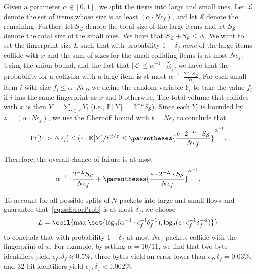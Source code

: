 Given a parameter $\alpha\in [0,1]$, we split the items into large and small ones. Let $\mathcal L$  denote the set of items whose size is at least $(\alpha\cdot N\epsilon_f)$, and let $\mathcal S$ denote the remaining. 
Further, let $S_{\mathcal L}$ denote the total size of the large items and let $S_{\mathcal S}$ denote the total size of the small ones. We have that $S_{\mathcal L}+S_{\mathcal S}\le N$.
We want to set the fingerprint size $L$ such that with probability $1-\delta_f$ \emph{none} of the large items collide with $x$ and the sum of sizes for the small colliding items is at most $N\epsilon_f$. 
Using the union bound, and the fact that $|\mathcal L|\le \alpha^{-1}\cdot \frac{S_{\mathcal L}}{N\epsilon_f}$, we have that the probability for a collision with a large item is at most $\alpha^{-1}\cdot\frac{2^{-L}S_{\mathcal L}}{N\epsilon_f}$.
For each small item $i$ with size $f_i\le \alpha\cdot N\epsilon_f$, we define the random variable $Y_i$ to take the value $f_i$ if $i$ has the same fingerprint as $x$ and $0$ otherwise. The total volume that collides with $x$ is then $Y=\sum_{i\in\mathcal S}Y_i$ (i.e., $\mathbb E[Y]=2^{-L}S_{\mathcal S}$). Since each $Y_i$ is bounded by $z=(\alpha\cdot N\epsilon_f)$, we use the Chernoff bound with $t=N\epsilon_f$ to conclude that
{\small \vspace*{-2mm}$$
\Pr[Y > N\epsilon_f]\le (e\cdot \mathbb E[Y]/t)^{t/z}
\le \parentheses{\frac{e\cdot 2^{-L}\cdot S_{\mathcal S}}{N\epsilon_f}}^{\alpha^{-1}}
.
$$\vspace*{-2mm}}

Therefore, the overall chance of failure is at most 
{\small
\begin{align}
\vspace*{-2mm}
\label{eq:ssErrorProb}
\alpha^{-1}\cdot\frac{2^{-L}S_{\mathcal L}}{N\epsilon_f} +  \parentheses{{\frac{e\cdot 2^{-L}\cdot S_{\mathcal S}}{N\epsilon_f}}}^{\alpha^{-1}}.%
\vspace*{-2mm}
\end{align}
}

To account for all possible splits of $N$ packets into large and small flows and guarantee that~\eqref{eq:ssErrorProb} is at most $\delta_f$, we choose 
$$L=\ceil{\max\set{\log_2(\alpha^{-1}\cdot\epsilon_f^{-1}\delta_f^{-1}),\log_2(e\cdot\epsilon_f^{-1}\delta_f^{-\alpha})}}$$ to conclude that with probability $1-\delta_f$ at most $N\epsilon_f$ packets collide with the fingerprint of $x$.
For example, by setting $\alpha=10/11$, we find that two byte identifiers yield $\epsilon_f,\delta_f\approx 0.5\%$, three bytes yield an error lower than $\epsilon_f,\delta_f=0.03\%$, and $32$-bit identifiers yield $\epsilon_f,\delta_f < 0.002\%$.


